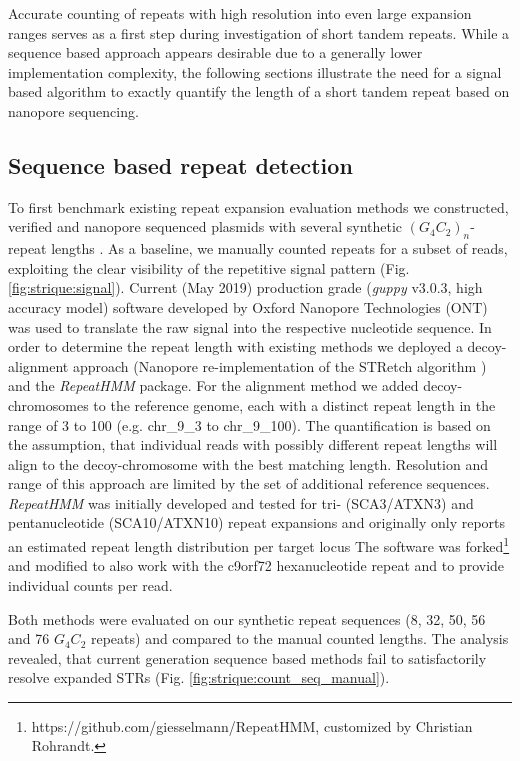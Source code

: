Accurate counting of repeats with high resolution into even large expansion ranges serves as a first step during investigation of short tandem repeats. While a sequence based approach appears desirable due to a generally lower implementation complexity, the following sections illustrate the need for a signal based algorithm to exactly quantify the length of a short tandem repeat based on nanopore sequencing.

\subsection{Sequence based repeat detection}
\label{subsec:strique:seq_repeat_counts}

To first benchmark existing repeat expansion evaluation methods we constructed, verified and nanopore sequenced plasmids with several synthetic $ (G_{4}C_{2})_{n} $-repeat lengths \cite{Mizielinska2014}. As a baseline, we manually counted repeats for a subset of reads, exploiting the clear visibility of the repetitive signal pattern (Fig. \ref{fig:strique:signal}). Current (May 2019) production grade (\textit{guppy} v3.0.3, high accuracy model) software developed by Oxford Nanopore Technologies (ONT) was used to translate the raw signal into the respective nucleotide sequence. In order to determine the repeat length with existing methods we deployed a decoy-alignment approach (Nanopore re-implementation of the STRetch algorithm \cite{Dashnow2018}) and the \textit{RepeatHMM} \cite{Liu2017} package. For the alignment method we added decoy-chromosomes to the reference genome, each with a distinct repeat length in the range of 3 to 100 (e.g. chr\_9\_3 to chr\_9\_100). The quantification is based on the assumption, that individual reads with possibly different repeat lengths will align to the decoy-chromosome with the best matching length. Resolution and range of this approach are limited by the set of additional reference sequences.
\textit{RepeatHMM} was initially developed and tested for tri- (SCA3/ATXN3) and pentanucleotide (SCA10/ATXN10) repeat expansions and originally only reports an estimated repeat length distribution per target locus The software was forked\footnote{https://github.com/giesselmann/RepeatHMM, customized by Christian Rohrandt.} and modified to also work with the c9orf72 hexanucleotide repeat and to provide individual counts per read.

Both methods were evaluated on our synthetic repeat sequences (8, 32, 50, 56 and 76 $ G_{4}C_{2} $ repeats) and compared to the manual counted lengths. The analysis revealed, that current generation sequence based methods fail to satisfactorily resolve expanded STRs (Fig. \ref{fig:strique:count_seq_manual}).


